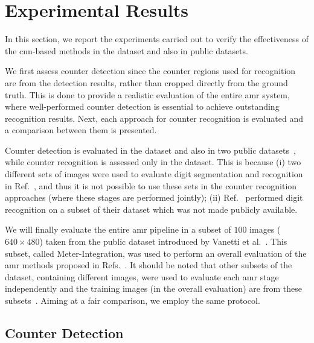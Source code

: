 \section{Experimental Results}
\label{sec:results}

In this section, we report the experiments carried out to verify the effectiveness of the \gls*{cnn}-based methods in the \dataset dataset and also in public datasets. 

We first assess counter detection since the counter regions used for recognition are from the detection results, rather than cropped directly from the ground truth.
This is done to provide a realistic evaluation of the entire \gls*{amr} system, where well-performed counter detection is essential to achieve outstanding recognition results. 
Next, each approach for counter recognition is evaluated and a comparison between them is presented. 

Counter detection is evaluated in the \dataset dataset and also in two public datasets~\cite{vanetti2013gas,goncalves2016reconhecimento}, while counter recognition is assessed only in the \dataset dataset. This is because (i) two different sets of images were used to evaluate digit segmentation and recognition in Ref.~, and thus it is not possible to use these sets in the counter recognition approaches (where these stages are performed jointly); (ii) Ref.~ performed digit recognition on a subset of their dataset which was not made publicly available.

We will finally evaluate the entire \gls*{amr} pipeline in a subset of $100$ images ($640\times480$) taken from the public dataset introduced by Vanetti et al.~\cite{vanetti2013gas}. This subset, called Meter-Integration, was used to perform an overall evaluation of the \gls*{amr} methods proposed in Refs.~. It should be noted that other subsets of the dataset, containing different images, were used to evaluate each \gls*{amr} stage independently and the training images (in the overall evaluation) are from these subsets~\cite{vanetti2013gas}. 
Aiming at a fair comparison, we employ the same protocol.

\subsection{Counter Detection}
\label{subsec:results_detection}

